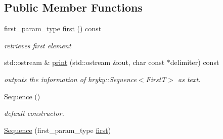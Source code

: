 \subsection*{Public Member Functions}
\begin{DoxyCompactItemize}
\item 
\hypertarget{classhryky_1_1_sequence_3_01_first_t_00_01hryky_1_1_null_01_4_a0d8ae11dc1440e58f69c5004dca414c6}{first\-\_\-param\-\_\-type \hyperlink{classhryky_1_1_sequence_3_01_first_t_00_01hryky_1_1_null_01_4_a0d8ae11dc1440e58f69c5004dca414c6}{first} () const }\label{classhryky_1_1_sequence_3_01_first_t_00_01hryky_1_1_null_01_4_a0d8ae11dc1440e58f69c5004dca414c6}

\begin{DoxyCompactList}\small\item\em retrieves first element \end{DoxyCompactList}\item 
\hypertarget{classhryky_1_1_sequence_3_01_first_t_00_01hryky_1_1_null_01_4_aead51d9c237fc57f021bf42407205897}{std\-::ostream \& \hyperlink{classhryky_1_1_sequence_3_01_first_t_00_01hryky_1_1_null_01_4_aead51d9c237fc57f021bf42407205897}{print} (std\-::ostream \&out, char const $\ast$delimiter) const }\label{classhryky_1_1_sequence_3_01_first_t_00_01hryky_1_1_null_01_4_aead51d9c237fc57f021bf42407205897}

\begin{DoxyCompactList}\small\item\em outputs the information of hryky\-::\-Sequence$<$\-First\-T$>$ as text. \end{DoxyCompactList}\item 
\hypertarget{classhryky_1_1_sequence_3_01_first_t_00_01hryky_1_1_null_01_4_aa8343b1c7af4fdbf63b05fd02097a75d}{\hyperlink{classhryky_1_1_sequence_3_01_first_t_00_01hryky_1_1_null_01_4_aa8343b1c7af4fdbf63b05fd02097a75d}{Sequence} ()}\label{classhryky_1_1_sequence_3_01_first_t_00_01hryky_1_1_null_01_4_aa8343b1c7af4fdbf63b05fd02097a75d}

\begin{DoxyCompactList}\small\item\em default constructor. \end{DoxyCompactList}\item 
\hypertarget{classhryky_1_1_sequence_3_01_first_t_00_01hryky_1_1_null_01_4_a6cb80a121c5181868da8e9b1f76ee6bf}{\hyperlink{classhryky_1_1_sequence_3_01_first_t_00_01hryky_1_1_null_01_4_a6cb80a121c5181868da8e9b1f76ee6bf}{Sequence} (first\-\_\-param\-\_\-type \hyperlink{classhryky_1_1_sequence_3_01_first_t_00_01hryky_1_1_null_01_4_a0d8ae11dc1440e58f69c5004dca414c6}{first})}\label{classhryky_1_1_sequence_3_01_first_t_00_01hryky_1_1_null_01_4_a6cb80a121c5181868da8e9b1f76ee6bf}


\end{DoxyCompactItemize}
